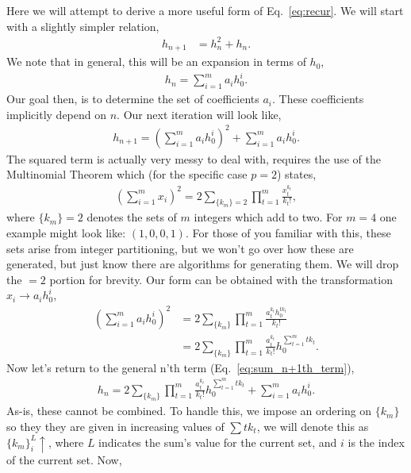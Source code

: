 \documentclass[../../main.tex]{subfiles}
\begin{document}
		\newpage
		\begin{appendices}
			Here we will attempt to derive a more useful form of Eq.~\ref{eq:recur}. We will start with a slightly simpler relation,
			\begin{align}
				h_{n+1} &= h_n^2 + h_n.
			\end{align}
			We note that in general, this will be an expansion in terms of $h_0$,
			\begin{align}
				h_n = \sum_{i=1}^m a_i h_0^i.
			\end{align}
			Our goal then, is to determine the set of coefficients ${a_i}$. These coefficients implicitly depend on $n$. Our next iteration will look like,
			\begin{align}\label{eq:sum_n+1th_term}
				h_{n+1} = \left(\sum_{i=1}^m a_i h_0^i\right)^2 + \sum_{i=1}^m a_i h_0^i.
			\end{align}
			The squared term is actually very messy to deal with, requires the use of the Multinomial Theorem which (for the specific case $p=2$) states,
			\begin{align}
				\left(\sum_{i=1}^m x_i\right)^2 = 2\sum_{\{k_m\}=2} \prod_{t=1}^m \frac{x_t^{k_t}}{k_t!},
			\end{align}
			where $\{k_m\}=2$ denotes the sets of $m$ integers which add to two. For $m=4$ one example might look like: $(1, 0, 0, 1)$. For those of you familiar with this, these sets arise from integer partitioning, but we won't go over how these are generated, but just know there are algorithms for generating them. We will drop the $=2$ portion for brevity. Our form can be obtained with the transformation $x_i\to a_ih_0^i$,
			\begin{align}
				\left(\sum_{i=1}^m a_ih_0^i\right)^2 &= 2\sum_{\{k_m\}} \prod_{t=1}^m \frac{a_t^{k_t} h_0^{tk_t}}{k_t!} \\
				&= 2\sum_{\{k_m\}} \prod_{t=1}^m \frac{a_t^{k_t}}{k_t!} h_0^{\sum_{t=1}^m tk_t}.
			\end{align}
			Now let's return to the general n'th term (Eq.~\ref{eq:sum_n+1th_term}),
			\begin{align}
				h_n = 2\sum_{\{k_m\}} \prod_{t=1}^m \frac{a_t^{k_t}}{k_t!} h_0^{\sum_{t=1}^m tk_t} + \sum_{i=1}^m a_i h_0^i.
			\end{align}
			As-is, these cannot be combined. To handle this, we impose an ordering on $\{k_m\}$ so they they are given in increasing values of $\sum tk_t$, we will denote this as $\{k_m\}_i^{L}\uparrow$, where $L$ indicates the sum's value for the current set, and $i$ is the index of the current set. Now,

\end{appendices}
\end{document}
